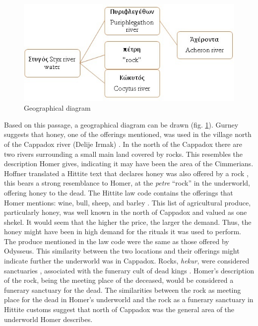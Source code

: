 	
		\begin{figure}[!htp]
			\includegraphics[width=\linewidth]{figures/Norman_figure1}%
			\caption{Geographical diagram}
			\label{normann_figure1} %
		\end{figure}
\noindent Based on this passage, a geographical diagram can be drawn (fig. \ref{normann_figure1}).
Gurney suggests that honey, one of the offerings mentioned, was used in the village north of the Cappadox river (Delije Irmak) \parencite[77]{Gurney1990}. In the north of the Cappadox there are two rivers surrounding a small main land covered by rocks. This resembles the description Homer gives, indicating it may have been the area of the Cimmerians. Hoffner translated a Hittite text that declares honey was also offered by a rock \parencite[346]{Hoffner1997}, this bears a strong resemblance to Homer, at the \emph{petre} “rock” in the underworld, offering honey to the dead. The Hittite law code contains the offerings that Homer mentions: wine, bull, sheep, and barley \parencite[82]{Gurney1990}. This list of agricultural produce, particularly honey, was well known in the north of Cappadox and valued as one shekel. It would seem that the higher the price, the larger the demand. Thus, the honey might have been in high demand for the rituals it was used to perform. The produce mentioned in the law code were the same as those offered by Odysseus. This similarity between the two locations and their offerings might indicate further the underworld was in Cappadox. Rocks, \emph{hekur}, were considered sanctuaries \parencite{Slocum2014}, associated with the funerary cult of dead kings \parencite[43]{Harmansah2014}. Homer’s description of the rock, being the meeting place of the deceased, would be considered a funerary sanctuary for the dead. The similarities between the rock as meeting place for the dead in Homer’s underworld and the rock as a funerary sanctuary in Hittite customs suggest that north of Cappadox was the general area of the underworld Homer describes. 
	
